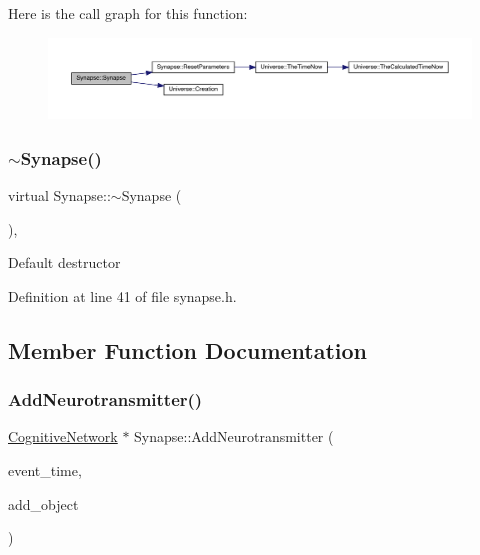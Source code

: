 Here is the call graph for this function\+:\nopagebreak
\begin{figure}[H]
\begin{center}
\leavevmode
\includegraphics[width=350pt]{class_synapse_ab651f847b74235df5121fe42faf3f253_cgraph}
\end{center}
\end{figure}
\mbox{\label{class_synapse_a882bfd0fbb2aead46c1410ab310920e5}} 
\subsubsection{\texorpdfstring{$\sim$\+Synapse()}{~Synapse()}}
{\footnotesize\ttfamily virtual Synapse\+::$\sim$\+Synapse (\begin{DoxyParamCaption}{ }\end{DoxyParamCaption})\hspace{0.3cm}{\ttfamily [inline]}, {\ttfamily [virtual]}}

Default destructor 

Definition at line 41 of file synapse.\+h.



\subsection{Member Function Documentation}
\mbox{\label{class_synapse_a76b96e3f71f9e7b0ba6b80166c3883f7}} 
\subsubsection{\texorpdfstring{Add\+Neurotransmitter()}{AddNeurotransmitter()}}
{\footnotesize\ttfamily \mbox{\hyperlink{class_cognitive_network}{Cognitive\+Network}} $\ast$ Synapse\+::\+Add\+Neurotransmitter (\begin{DoxyParamCaption}\item[{std\+::chrono\+::time\+\_\+point$<$ \mbox{\hyperlink{universe_8h_a0ef8d951d1ca5ab3cfaf7ab4c7a6fd80}{Clock}} $>$}]{event\+\_\+time,  }\item[{\mbox{\hyperlink{class_cognitive_network}{Cognitive\+Network}} $\ast$}]{add\+\_\+object }\end{DoxyParamCaption})}



